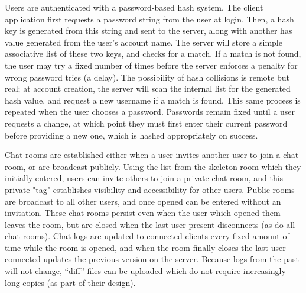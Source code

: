 \documentclass[12pt]{report}
\begin{document}
\begin{flushleft}
\indent Users are authenticated with a password-based hash system. The client application first requests a password string from the user at login. Then, a hash key is generated from this string and sent to the server, along with another has value generated from the user's account name. The server will store a simple associative list of these two keys, and checks for a match. If a match is not found, the user may try a fixed number of times before the server enforces a penalty for wrong password tries (a delay). The possibility of hash collisions is remote but real; at account creation, the server will scan the internal list for the generated hash value, and request a new username if a match is found. This same process is repeated when the user chooses a password. Passwords remain fixed until a user requests a change, at which point they must first enter their current password before providing a new one, which is hashed appropriately on success.%

\indent Chat rooms are established either when a user invites another user to join a chat room, or are broadcast publicly. Using the list from the skeleton room which they initially entered, users can invite others to join a private chat room, and this private "tag" establishes visibility and accessibility for other users. Public rooms are broadcast to all other users, and once opened can be entered without an invitation. These chat rooms persist even when the user which opened them leaves the room, but are closed when the last user present disconnects (as do all chat rooms). Chat logs are updated to connected clients every fixed amount of time while the room is opened, and when the room finally closes the last user connected updates the previous version on the server. Because logs from the past will not change, ``diff'' files can be uploaded which do not require increasingly long copies (as part of their design).


\end{flushleft}
\end{document}
